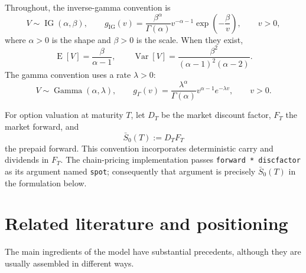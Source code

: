 \documentclass[11pt,a4paper]{article}
\DeclareMathOperator{\IG}{IG}
\DeclareMathOperator{\GammaDist}{Gamma}
\DeclareMathOperator{\Var}{Var}
\DeclareMathOperator{\E}{E}
\begin{document}
Throughout, the inverse-gamma convention is
\begin{equation}
  V\sim\IG(\alpha,\beta),\qquad
  g_{\IG}(v)=\frac{\beta^\alpha}{\Gamma(\alpha)}
  v^{-\alpha-1}\exp\left(-\frac{\beta}{v}\right),\qquad v>0,
  \label{eq:ig_density}
\end{equation}
where $\alpha>0$ is the shape and $\beta>0$ is the scale.  When they exist,
\begin{equation}
  \E[V]=\frac{\beta}{\alpha-1},\qquad
  \Var[V]=\frac{\beta^2}{(\alpha-1)^2(\alpha-2)}.
  \label{eq:ig_moments}
\end{equation}
The gamma convention uses a rate $\lambda>0$:
\begin{equation}
  V\sim\GammaDist(\alpha,\lambda),\qquad
  g_\Gamma(v)=\frac{\lambda^\alpha}{\Gamma(\alpha)}
  v^{\alpha-1}e^{-\lambda v},\qquad v>0.
  \label{eq:gamma_density}
\end{equation}

For option valuation at maturity $T$, let $D_T$ be the market discount factor,
$F_T$ the market forward, and
\begin{equation}
  \bar S_0(T):=D_TF_T
  \label{eq:prepaid_forward}
\end{equation}
the prepaid forward.  This convention incorporates deterministic carry and
dividends in $F_T$.  The chain-pricing implementation passes
\texttt{forward * discfactor} as its argument named \texttt{spot}; consequently
that argument is precisely $\bar S_0(T)$ in the formulation below.

\section{Related literature and positioning}
\label{sec:related_literature}

The main ingredients of the model have substantial precedents, although they
are usually assembled in different ways.
\end{document}
